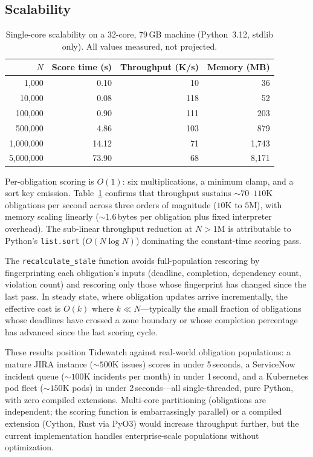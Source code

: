\documentclass[11pt]{article}
\begin{document}
\subsection{Scalability}
\label{sec:scalability}

\begin{table}[t]
\centering
\caption{Single-core scalability on a 32-core, 79\,GB machine
(Python~3.12, stdlib only).  All values measured, not projected.}
\label{tab:scalability}
\begin{tabular}{@{}rrrr@{}}
\toprule
\textbf{$N$} & \textbf{Score time (s)} & \textbf{Throughput (K/s)} &
\textbf{Memory (MB)} \\
\midrule
  1{,}000     & 0.10  &  10  &   36 \\
 10{,}000     & 0.08  & 118  &   52 \\
100{,}000     & 0.90  & 111  &  203 \\
500{,}000     & 4.86  & 103  &  879 \\
1{,}000{,}000 & 14.12 &  71  & 1{,}743 \\
5{,}000{,}000 & 73.90 &  68  & 8{,}171 \\
\bottomrule
\end{tabular}
\end{table}

Per-obligation scoring is $O(1)$: six multiplications, a minimum
clamp, and a sort key emission.  Table~\ref{tab:scalability} confirms
that throughput sustains ${\sim}70$--$110$K obligations per second
across three orders of magnitude ($10$K to $5$M), with memory
scaling linearly (${\sim}1.6$\,bytes per obligation plus fixed
interpreter overhead).  The sub-linear throughput reduction at
$N{>}1$M is attributable to Python's \texttt{list.sort}
($O(N \log N)$) dominating the constant-time scoring pass.

The \texttt{recalculate\_stale} function avoids full-population
rescoring by fingerprinting each obligation's inputs (deadline,
completion, dependency count, violation count) and rescoring only
those whose fingerprint has changed since the last pass.  In steady
state, where obligation updates arrive incrementally, the effective
cost is $O(k)$ where $k \ll N$---typically the small fraction of
obligations whose deadlines have crossed a zone boundary or whose
completion percentage has advanced since the last scoring cycle.

These results position Tidewatch against real-world obligation
populations: a mature JIRA instance (${\sim}500$K issues) scores in
under 5\,seconds, a ServiceNow incident queue (${\sim}100$K
incidents per month) in under 1\,second, and a Kubernetes pod fleet
(${\sim}150$K pods) in under 2\,seconds---all single-threaded, pure
Python, with zero compiled extensions.  Multi-core partitioning
(obligations are independent; the scoring function is embarrassingly
parallel) or a compiled extension (Cython, Rust via PyO3) would
increase throughput further, but the current implementation handles
enterprise-scale populations without optimization.
\end{document}
